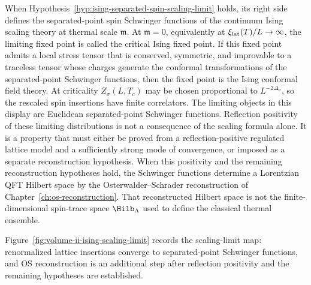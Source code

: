 When Hypothesis~\ref{hyp:ising-separated-spin-scaling-limit} holds, its right
side defines the separated-point spin Schwinger functions of the continuum
Ising scaling theory at thermal scale \(\mathfrak m\).  At
\(\mathfrak m=0\), equivalently at \(\xi_{\rm lat}(T)/L\to\infty\), the
limiting fixed point is called the critical Ising fixed point.  If this fixed
point admits a local stress tensor that is conserved, symmetric, and
improvable to a traceless tensor whose charges generate the conformal
transformations of the separated-point Schwinger functions, then the fixed
point is the Ising conformal field theory.  At criticality
\(Z_\sigma(L,T_c)\) may be chosen proportional to \(L^{-2\Delta_\sigma}\), so
the rescaled spin insertions have finite correlators.
The limiting objects in this display are Euclidean separated-point Schwinger
functions.  Reflection positivity of these limiting distributions is not a
consequence of the scaling formula alone.  It is a property that must either be
proved from a reflection-positive regulated lattice model and a sufficiently
strong mode of convergence, or imposed as a separate reconstruction
hypothesis.  When this positivity and the remaining reconstruction hypotheses
hold, the Schwinger functions determine a Lorentzian QFT Hilbert space by the
Osterwalder--Schrader reconstruction of
Chapter~\ref{ch:os-reconstruction}.  That reconstructed Hilbert space is not
the finite-dimensional spin-trace space \(\Hilb_\Lambda\) used to define the
classical thermal ensemble.

Figure~\ref{fig:volume-ii-ising-scaling-limit} records the scaling-limit map:
renormalized lattice insertions converge to separated-point Schwinger
functions, and OS reconstruction is an additional step after reflection
positivity and the remaining hypotheses are established.

